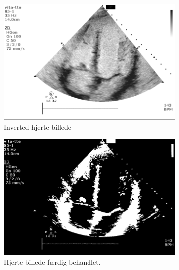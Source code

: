 \documentclass{article}
\begin{document}
\begin{figure}[H]
     \begin{subfigure}[b]{0.49\textwidth}
        \includegraphics[width=\textwidth]{Image/HeartInvert.png}
        \caption{Inverted hjerte billede}
        \label{fig:f9}
    \end{subfigure}
     \begin{subfigure}[b]{0.49\textwidth}   
        \includegraphics[width=\textwidth]{Image/HeartFinal.png}
        \caption{Hjerte billede færdig behandlet.}
        \label{fig:f10}
    \end{subfigure}
        \caption{}
    \label{fig:image5}
\end{figure}



\newpage
\end{document}
